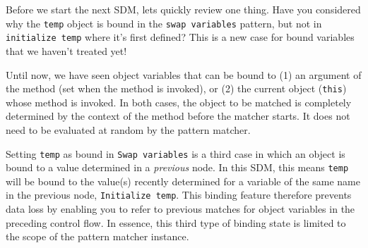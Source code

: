 \newpage
\genHeader
\hypertarget{invert close}{}

\vspace*{2cm}

Before we start the next SDM, lets quickly review one thing. Have you considered why the \texttt{temp} object is bound in the \texttt{swap variables}
pattern, but not in \texttt{initialize temp} where it's first defined? This is a new case for bound variables that we haven't treated yet!

Until now, we have seen object variables that can be bound to (1) an argument of the method (set when the method is invoked), or (2) the
current object (\texttt{this}) whose method is invoked. In both cases, the object to be matched is completely determined by the context of the method before
the matcher starts. It does not need to be evaluated at random by the pattern matcher.

Setting \texttt{temp} as bound in \texttt{Swap variables} is a third case in which an object is bound to a value determined in a \emph{previous} node. In
this SDM, this means \texttt{temp} will be bound to the value(s) recently determined for a variable of the same name in the previous node, \texttt{Initialize
temp}. This binding feature therefore prevents data loss by enabling you to refer to previous matches for object variables in the preceding control flow. In
essence, this third type of binding state is limited to the scope of the pattern matcher instance.

